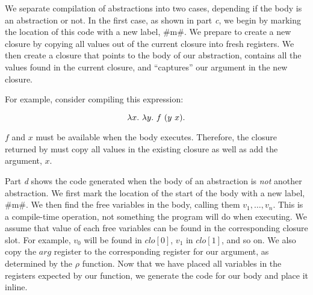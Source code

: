 \documentclass[12pt]{report}
\begin{document}
We separate compilation of abstractions into two cases, depending if
the body is an abstraction or not. In the first case, as shown in part
\emph{c}, we begin by marking the location of this code with a new label,
#m#. We prepare to create a new closure by copying all values out of
the current closure into fresh registers. We then create a closure that
points to the body of our abstraction, contains all the values found
in the current closure, and ``captures'' our argument in the new
closure. 

For example, consider compiling this expression:

\begin{equation}
  \lambda x.\ \lambda y.\ f\ (y\ x). 
\end{equation}

$f$ and $x$ must be available when the body
 executes. Therefore, the closure returned
by  must copy all values in the existing
closure as well as add the argument, $x$.

Part \emph{d} shows the code generated when the body of an abstraction
is \emph{not} another abstraction. We first mark the location of the
start of the body with a new label, #m#.  We then find the free
variables in the body, calling them $v_1, \dots, v_n$. This is a
compile-time operation, not something the program will do when
executing.  We assume that value of each free variables can be found
in the corresponding closure slot. For example, $v_0$ will be found in
$clo[0]$, $v_1$ in $clo[1]$, and so on. We also copy the $arg$
register to the corresponding register for our argument, as determined
by the $\rho$ function. Now that we have placed all variables in the
registers expected by our function, we generate the code for our body
and place it inline.
\end{document}
